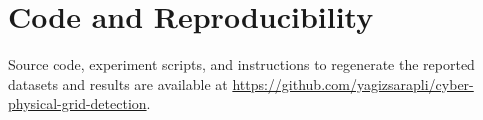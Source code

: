 \documentclass[conference]{IEEEtran}
\begin{document}
\section*{Code and Reproducibility}
Source code, experiment scripts, and instructions to regenerate the reported datasets and results are available at \url{https://github.com/yagizsarapli/cyber-physical-grid-detection}.



\end{document}
